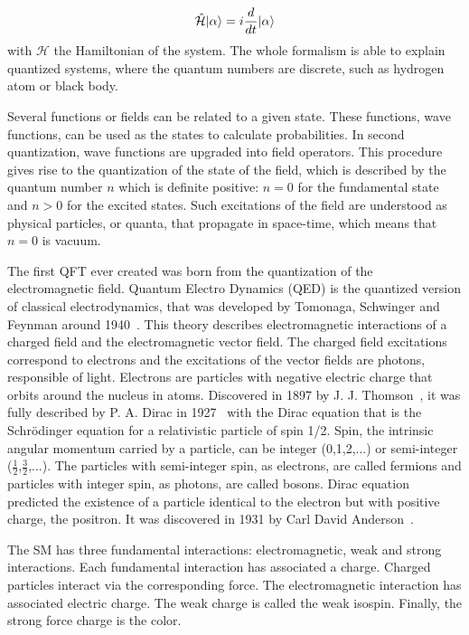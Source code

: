 \begin{equation}
  \label{eq:Schrodinger}
  \hat{\mathcal{H}}| \alpha\rangle=i\frac{d}{dt}| \alpha\rangle
\end{equation}with $\mathcal{H}$ the Hamiltonian of the system. The whole formalism is able to explain quantized systems, where the quantum numbers are discrete, such as hydrogen atom or black body.

Several functions or fields can be related to a given state. These functions, wave functions, can be used as the states to calculate probabilities. In second quantization, wave functions are upgraded into field operators. This procedure gives rise to the quantization of the state of the field, which is described by the quantum number $n$ which is definite positive: $n=0$ for the fundamental state and $n>0$ for the excited states. Such excitations of the field are understood as physical particles, or quanta, that propagate in space-time, which means that $n=0$ is vacuum. 

The first QFT ever created was born from the quantization of the electromagnetic field. Quantum Electro Dynamics (QED) is the quantized version of classical electrodynamics, that was developed by Tomonaga, Schwinger and Feynman around 1940~\cite{Tomonaga:1948zz, Schwinger:1948yk, Feynman:1948ur}. This theory describes electromagnetic interactions of a charged field and the electromagnetic vector field. The charged field excitations correspond to electrons and the excitations of the vector fields are photons, responsible of light. Electrons are particles with negative electric charge that orbits around the nucleus in atoms. Discovered in 1897 by J. J. Thomson~\cite{Thomson:1897cm}, it was fully described by P. A. Dirac in 1927~\cite{Dirac:1927dy} with the Dirac equation that is the Schr\"{o}dinger equation for a relativistic particle of spin 1/2. Spin, the intrinsic angular momentum carried by a particle, can be integer (0,1,2,...) or semi-integer ($\frac{1}{2}$,$\frac{3}{2}$,...). The particles with semi-integer spin, as electrons, are called fermions and particles with integer spin, as photons, are called bosons. Dirac equation predicted the existence of a particle identical to the electron but with positive charge, the positron. It was discovered in 1931 by Carl David Anderson~\cite{Anderson:1933mb}.

The SM has three fundamental interactions: electromagnetic, weak and strong interactions. Each fundamental interaction has associated a charge. Charged particles interact via the corresponding force. The electromagnetic interaction has associated electric charge. The weak charge is called the weak isospin. Finally, the strong force charge is the color.

